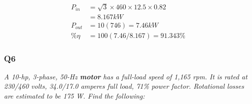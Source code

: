 \documentclass[a4paper,11pt]{article}
\begin{document}
\begin{align*}
    P_{in}  & =\sqrt{3}\times460\times12.5\times0.82 \\
            & = 8.167kW                              \\
    P_{out} & = 10(746) = 7.46kW                     \\
    \%\eta  & = 100(7.46/8.167)=91.343\%
\end{align*}

\newpage
\subsubsection*{Q6}

\textit{A 10-hp, 3-phase, 50-Hz \textbf{motor} has a full-load speed of 1,165 rpm. It is rated at 230/460 volts, 34.0/17.0 amperes full load, 71\% power factor. Rotational losses are estimated to be 175 W. Find the following:}
\end{document}
